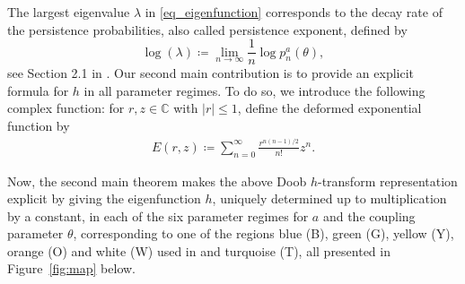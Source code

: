 \documentclass[12pt]{article}
\newcommand{\C}{\mathbb{C}} %
\newcommand{\1}{\mathds{1}}
\theoremstyle{definition}
\theoremstyle{plain}
\theoremstyle{remark}
\begin{document}
The largest eigenvalue $\lambda$ in \eqref{eq_eigenfunction} corresponds to the decay rate of the persistence probabilities, also called persistence exponent, defined by 
$$\log(\lambda)\coloneqq\lim_{n\to\infty}\frac{1}{n}\log p_n^a(\theta),$$ see Section 2.1 in \cite{AMZ}.
Our second main contribution is to provide an explicit formula for $h$ in all parameter regimes. To do so, we introduce the following complex function: for $r,z\in\C$ with $|r|\leq1$, define the deformed exponential function by 
\begin{align*}
E(r,z)\coloneqq \sum_{n=0}^\infty \frac{r^{n(n-1)/2}}{n!}z^n.
\end{align*}

Now, the second main theorem makes the above Doob $h$-transform representation explicit by giving the eigenfunction $h$, uniquely determined up to multiplication by a constant, in each of the six parameter regimes for $a$ and the coupling parameter $\theta$, corresponding to one of the regions blue (B), green (G), yellow (Y), orange (O) and white (W) used in \cite{AurzadaRaschel} and turquoise (T), all presented in Figure~\ref{fig:map} below. 
\end{document}
